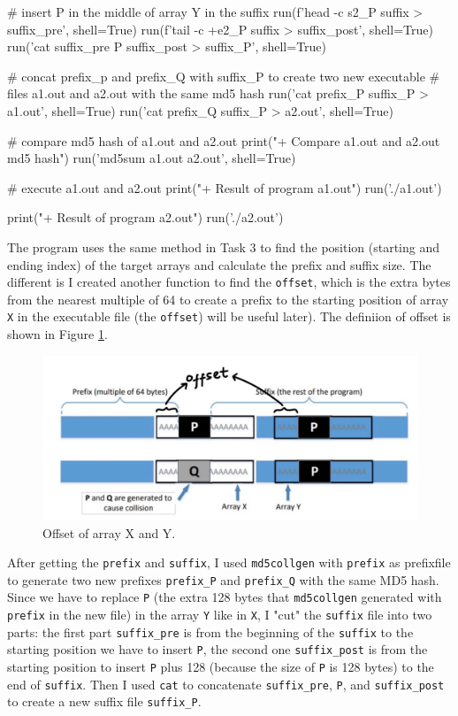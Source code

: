\documentclass{article}
\begin{document}
\begin{python}
    # insert P in the middle of array Y in the suffix
    run(f'head -c {s2_P} suffix > suffix_pre', shell=True)
    run(f'tail -c +{e2_P} suffix > suffix_post', shell=True)
    run('cat suffix_pre P suffix_post > suffix_P', shell=True)

    # concat prefix_p and prefix_Q with suffix_P to create two new executable
    # files a1.out and a2.out with the same md5 hash
    run('cat prefix_P suffix_P > a1.out', shell=True)
    run('cat prefix_Q suffix_P > a2.out', shell=True)

    # compare md5 hash of a1.out and a2.out
    print("\n+ Compare a1.out and a2.out md5 hash")
    run('md5sum a1.out a2.out', shell=True)

    # execute a1.out and a2.out
    print("\n+ Result of program a1.out")
    run('./a1.out')

    print("\n+ Result of program a2.out")
    run('./a2.out')
\end{python}

The program uses the same method in Task 3 to find the position (starting
and ending index) of the target arrays and calculate the prefix and suffix size.
The different is I created another function to find the \texttt{offset}, which
is the extra bytes from the nearest multiple of 64 to create a prefix to the
starting position of array \texttt{X} in the executable file (the \texttt{offset})
will be useful later). The definiion of offset is shown in Figure \ref{fig:task4_offset}.

\begin{figure}[!ht]
    \centering
    \includegraphics[scale=0.25]{task4.1.jpg}
    \caption{Offset of array X and Y.}
    \label{fig:task4_offset}
\end{figure}

After getting the \texttt{prefix} and \texttt{suffix}, I used \texttt{md5collgen}
with \texttt{prefix} as prefixfile to generate two new prefixes \texttt{prefix\_P}
and \texttt{prefix\_Q} with the same MD5 hash. Since we have to replace \texttt{P}
(the extra 128 bytes that \texttt{md5collgen} generated with \texttt{prefix} in
the new file) in the array \texttt{Y} like in \texttt{X}, I "cut" the \texttt{suffix}
file into two parts: the first part \texttt{suffix\_pre} is from the beginning of the \texttt{suffix}
to the starting position we have to insert \texttt{P}, the second one \texttt{suffix\_post}
is from the starting position to insert \texttt{P} plus 128 (because the size of
\texttt{P} is 128 bytes) to the end of \texttt{suffix}. Then I used \texttt{cat}
to concatenate \texttt{suffix\_pre}, \texttt{P}, and \texttt{suffix\_post} to
create a new suffix file \texttt{suffix\_P}.
\end{document}
